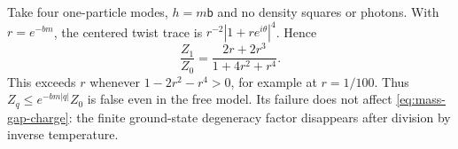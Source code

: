 \begin{remark}
\label{rem:mass-gap-thermal}
Take four one-particle modes, $h=m\mathsf b$ and no density squares or
photons. With $r=e^{-bm}$, the centered twist trace is
$r^{-2}|1+r e^{i\theta}|^4$. Hence
\[
 \frac{Z_1}{Z_0}=\frac{2r+2r^3}{1+4r^2+r^4}.
\]
This exceeds $r$ whenever $1-2r^2-r^4>0$, for example at $r=1/100$.
Thus $Z_q\le e^{-bm|q|}Z_0$ is false even in the free model. Its failure
does not affect \eqref{eq:mass-gap-charge}: the finite ground-state
degeneracy factor disappears after division by inverse temperature.
\end{remark}

